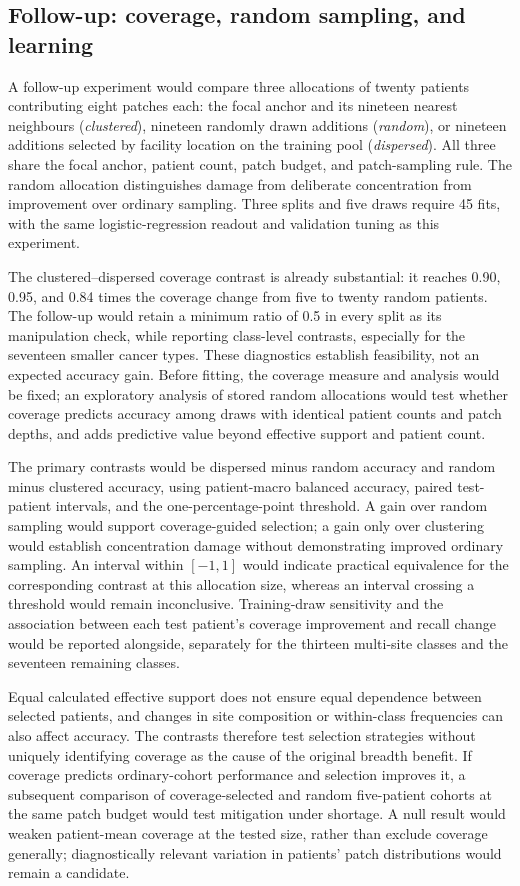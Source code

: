 \subsection{Follow-up: coverage, random sampling, and learning}
\label{sec:follow-up}
A follow-up experiment would compare three allocations of twenty patients contributing eight patches each: the focal anchor and its nineteen nearest neighbours (\emph{clustered}), nineteen randomly drawn additions (\emph{random}), or nineteen additions selected by facility location on the training pool (\emph{dispersed}). All three share the focal anchor, patient count, patch budget, and patch-sampling rule. The random allocation distinguishes damage from deliberate concentration from improvement over ordinary sampling. Three splits and five draws require 45 fits, with the same logistic-regression readout and validation tuning as this experiment.

The clustered--dispersed coverage contrast is already substantial: it reaches 0.90, 0.95, and 0.84 times the coverage change from five to twenty random patients. The follow-up would retain a minimum ratio of 0.5 in every split as its manipulation check, while reporting class-level contrasts, especially for the seventeen smaller cancer types. These diagnostics establish feasibility, not an expected accuracy gain. Before fitting, the coverage measure and analysis would be fixed; an exploratory analysis of stored random allocations would test whether coverage predicts accuracy among draws with identical patient counts and patch depths, and adds predictive value beyond effective support and patient count.

The primary contrasts would be dispersed minus random accuracy and random minus clustered accuracy, using patient-macro balanced accuracy, paired test-patient intervals, and the one-percentage-point threshold. A gain over random sampling would support coverage-guided selection; a gain only over clustering would establish concentration damage without demonstrating improved ordinary sampling. An interval within $[-1,1]$ would indicate practical equivalence for the corresponding contrast at this allocation size, whereas an interval crossing a threshold would remain inconclusive. Training-draw sensitivity and the association between each test patient's coverage improvement and recall change would be reported alongside, separately for the thirteen multi-site classes and the seventeen remaining classes.

Equal calculated effective support does not ensure equal dependence between selected patients, and changes in site composition or within-class frequencies can also affect accuracy. The contrasts therefore test selection strategies without uniquely identifying coverage as the cause of the original breadth benefit. If coverage predicts ordinary-cohort performance and selection improves it, a subsequent comparison of coverage-selected and random five-patient cohorts at the same patch budget would test mitigation under shortage. A null result would weaken patient-mean coverage at the tested size, rather than exclude coverage generally; diagnostically relevant variation in patients' patch distributions would remain a candidate.
